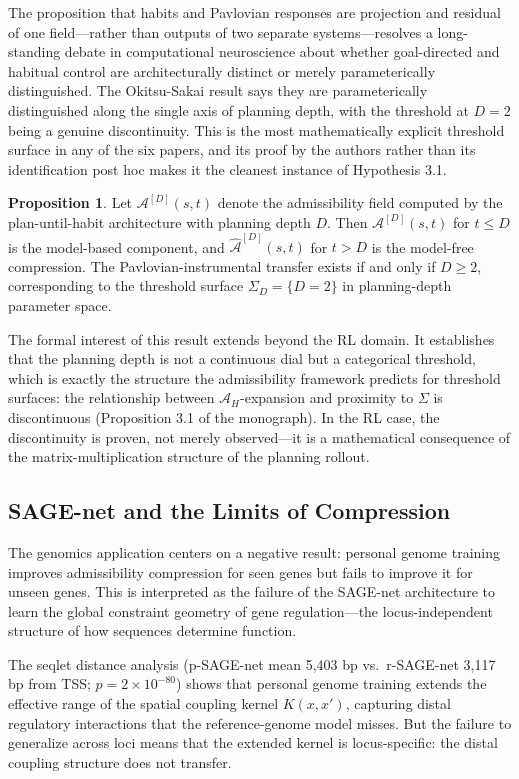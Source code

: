 \documentclass[12pt, a4paper]{article}
\theoremstyle{definition}
\newtheorem{prop}{Proposition}[section]
\begin{document}
The proposition that habits and Pavlovian responses are projection and residual of one field---rather than outputs of two separate systems---resolves a long-standing debate in computational neuroscience about whether goal-directed and habitual control are architecturally distinct or merely parameterically distinguished. The Okitsu-Sakai result says they are parameterically distinguished along the single axis of planning depth, with the threshold at $D = 2$ being a genuine discontinuity. This is the most mathematically explicit threshold surface in any of the six papers, and its proof by the authors rather than its identification post hoc makes it the cleanest instance of Hypothesis 3.1.

\begin{prop}
Let $\mathcal{A}^{[D]}(s,t)$ denote the admissibility field computed by the plan-until-habit architecture with planning depth $D$. Then $\mathcal{A}^{[D]}(s,t)$ for $t \leq D$ is the model-based component, and $\hat{\mathcal{A}}^{[D]}(s,t)$ for $t > D$ is the model-free compression. The Pavlovian-instrumental transfer exists if and only if $D \geq 2$, corresponding to the threshold surface $\Sigma_D = \{D = 2\}$ in planning-depth parameter space.
\end{prop}

The formal interest of this result extends beyond the RL domain. It establishes that the planning depth is not a continuous dial but a categorical threshold, which is exactly the structure the admissibility framework predicts for threshold surfaces: the relationship between $\mathcal{A}_H$-expansion and proximity to $\Sigma$ is discontinuous (Proposition 3.1 of the monograph). In the RL case, the discontinuity is proven, not merely observed---it is a mathematical consequence of the matrix-multiplication structure of the planning rollout.

\subsection{SAGE-net and the Limits of Compression}

The genomics application centers on a negative result: personal genome training improves admissibility compression for seen genes but fails to improve it for unseen genes. This is interpreted as the failure of the SAGE-net architecture to learn the global constraint geometry of gene regulation---the locus-independent structure of how sequences determine function.

The seqlet distance analysis (p-SAGE-net mean 5,403 bp vs.\ r-SAGE-net 3,117 bp from TSS; $p = 2 \times 10^{-80}$) shows that personal genome training extends the effective range of the spatial coupling kernel $K(x,x')$, capturing distal regulatory interactions that the reference-genome model misses. But the failure to generalize across loci means that the extended kernel is locus-specific: the distal coupling structure does not transfer.
\end{document}

